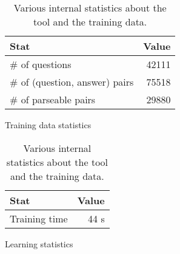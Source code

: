 \begin{table}
    \begin{subfigure}[b]{0.48\textwidth}
        \begin{center}
        \begin{tabular}[t]{lr}
            \textbf{Stat} & \textbf{Value} \\
            \hline
            \# of questions                & 42111 \\
            \# of (question, answer) pairs & 75518 \\
            \# of parseable pairs          & 29880 \\
        \end{tabular}
        \end{center}
        \caption{Training data statistics}
    \end{subfigure}
    \begin{subfigure}[b]{0.48\textwidth}
        \begin{center}
        \begin{tabular}[t]{lr}
            \textbf{Stat} & \textbf{Value} \\
            \hline
            Training time & 44 s \\
        \end{tabular}
        \end{center}
        \caption{Learning statistics}
    \end{subfigure}
    \caption{Various internal statistics about the tool and the training data.}
    \label{tbl:stats}
\end{table}


